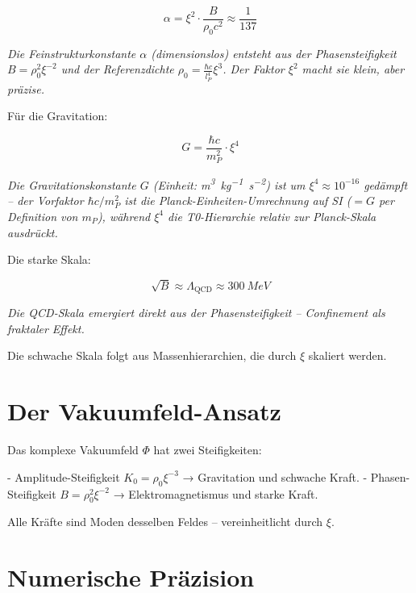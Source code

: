	\begin{equation}
		\alpha = \xi^2 \cdot \frac{B}{\rho_0 c^2} \approx \frac{1}{137}
	\end{equation}
	
	\textit{Die Feinstrukturkonstante \(\alpha\) (dimensionslos) entsteht aus der Phasensteifigkeit \(B = \rho_0^2 \xi^{-2}\) und der Referenzdichte \(\rho_0 = \frac{\hbar c}{l_P^4} \xi^3\). Der Faktor \(\xi^2\) macht sie klein, aber präzise.}
	
	Für die Gravitation:
	
	\begin{equation}
		G = \frac{\hbar c}{m_P^2} \cdot \xi^4
	\end{equation}
	
	\textit{Die Gravitationskonstante \(G\) (Einheit: \si{m^3.kg^{-1}.s^{-2}}) ist um \(\xi^4 \approx 10^{-16}\) gedämpft -- der Vorfaktor \(\hbar c / m_P^2\) ist die Planck-Einheiten-Umrechnung auf SI (\(= G\) per Definition von \(m_P\)), während \(\xi^4\) die T0-Hierarchie relativ zur Planck-Skala ausdrückt.}
	
	Die starke Skala:
	
	\begin{equation}
		\sqrt{B} \approx \Lambda_{\text{QCD}} \approx \SI{300}{MeV}
	\end{equation}
	
	\textit{Die QCD-Skala emergiert direkt aus der Phasensteifigkeit – Confinement als fraktaler Effekt.}
	
	Die schwache Skala folgt aus Massenhierarchien, die durch \(\xi\) skaliert werden.
	
	\section{Der Vakuumfeld-Ansatz}
	
	Das komplexe Vakuumfeld \(\Phi\) hat zwei Steifigkeiten:
	
	- Amplitude-Steifigkeit \(K_0 = \rho_0 \xi^{-3}\) → Gravitation und schwache Kraft.
	- Phasen-Steifigkeit \(B = \rho_0^2 \xi^{-2}\) → Elektromagnetismus und starke Kraft.
	
	Alle Kräfte sind Moden desselben Feldes – vereinheitlicht durch \(\xi\).
	
	\section{Numerische Präzision}
	
